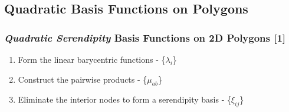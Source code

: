 \documentclass[compress,10pt]{beamer}
\begin{document}
\subsection{Quadratic Basis Functions on Polygons}
\begin{frame}[t]\frametitle{\small {\em Quadratic Serendipity} Basis Functions on 2D Polygons [1]}
\begin{block}{}
\begin{enumerate}
	\item <1-> Form the linear barycentric functions - \{$\lambda_i$\}
	\item <2-> Construct the pairwise products -  \{$\mu_{ab}$\}
	\item <3-> Eliminate the interior nodes to form a serendipity basis - \{$\xi_{ij}$\}
\end{enumerate}
\end{block}
\vspace{1cm}
\begin{columns}[c]
\centering
{}
\centering
{}
\end{columns}
\end{frame}
\end{document}
